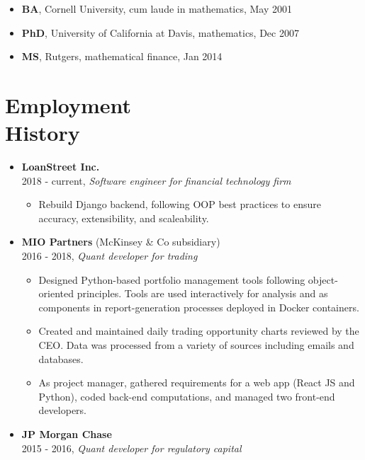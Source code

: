\documentclass[margin]{res}
\def\tightlist{}
\begin{document}
\begin{resume}
\begin{itemize}
\tightlist
\item
  \textbf{BA}, Cornell University, cum laude in mathematics, May 2001
\item
  \textbf{PhD}, University of California at Davis, mathematics, Dec 2007
\item
  \textbf{MS}, Rutgers, mathematical finance, Jan 2014
\end{itemize}

\section{\texorpdfstring{Employment\\
History}{Employment History}}\label{employment-history}

\begin{itemize}
\item
  \textbf{LoanStreet Inc.}\\
  2018 - current, \emph{Software engineer for financial technology firm}

  \begin{itemize}
  \tightlist
  \item
    Rebuild Django backend, following OOP best practices to ensure
    accuracy, extensibility, and scaleability.
  \end{itemize}
\item
  \textbf{MIO Partners} (McKinsey \& Co subsidiary)\\
  2016 - 2018, \emph{Quant developer for trading}

  \begin{itemize}
  \tightlist
  \item
    Designed Python-based portfolio management tools following
    object-oriented principles. Tools are used interactively for
    analysis and as components in report-generation processes deployed
    in Docker containers.
  \item
    Created and maintained daily trading opportunity charts reviewed by
    the CEO. Data was processed from a variety of sources including
    emails and databases.
  \item
    As project manager, gathered requirements for a web app (React JS
    and Python), coded back-end computations, and managed two front-end
    developers.
  \end{itemize}
\item
  \textbf{JP Morgan Chase}\\
  2015 - 2016, \emph{Quant developer for regulatory capital}


\end{itemize}
\end{resume}
\end{document}
